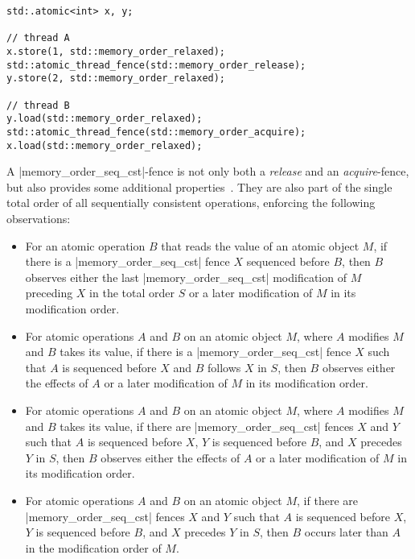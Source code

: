 \documentclass[a4paper,12pt,notitlepage,twoside,openright]{article}
\begin{document}
\begin{lstlisting}[caption={Example of \emph{synchronize-with} relation with release/acquire fences.}, label=lst:acquire-release-fence-synchronize-with]
std:.atomic<int> x, y;

// thread A
x.store(1, std::memory_order_relaxed);
std::atomic_thread_fence(std::memory_order_release);
y.store(2, std::memory_order_relaxed);

// thread B
y.load(std::memory_order_relaxed);
std::atomic_thread_fence(std::memory_order_acquire);
x.load(std::memory_order_relaxed);
\end{lstlisting}

A |memory_order_seq_cst|-fence is not only both a \emph{release} and
an \emph{acquire}-fence, but also provides some additional
properties~\cite[29.3.4-29.3.8]{c++11_standard}. They are also part of
the single total order of all sequentially consistent operations,
enforcing the following observations:
\begin{itemize}
	\item For an atomic operation $B$ that reads the value of an
          atomic object $M$, if there is a |memory_order_seq_cst|
          fence $X$ sequenced before $B$, then $B$ observes either the
          last |memory_order_seq_cst| modification of $M$ preceding
          $X$ in the total order $S$ or a later modification of $M$ in
          its modification order.
	\item For atomic operations $A$ and $B$ on an atomic object
          $M$, where $A$ modifies $M$ and $B$ takes its value, if
          there is a |memory_order_seq_cst| fence $X$ such that $A$ is
          sequenced before $X$ and $B$ follows $X$ in $S$, then $B$
          observes either the effects of $A$ or a later modification
          of $M$ in its modification order.
	\item For atomic operations $A$ and $B$ on an atomic object
          $M$, where $A$ modifies $M$ and $B$ takes its value, if
          there are |memory_order_seq_cst| fences $X$ and $Y$ such
          that $A$ is sequenced before $X$, $Y$ is sequenced before
          $B$, and $X$ precedes $Y$ in $S$, then $B$ observes either
          the effects of $A$ or a later modification of $M$ in its
          modification order.
	\item For atomic operations $A$ and $B$ on an atomic object
          $M$, if there are |memory_order_seq_cst| fences $X$ and $Y$
          such that $A$ is sequenced before $X$, $Y$ is sequenced
          before $B$, and $X$ precedes $Y$ in $S$, then $B$ occurs
          later than $A$ in the modification order of $M$.
\end{itemize}



\end{document}
